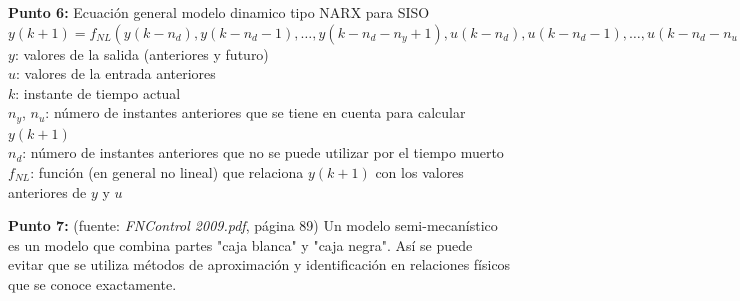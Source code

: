 \documentclass[10pt,onecolumn,twoside,letterpaper]{article}
\newcommand{\myreferences}{../../bib/library}
\begin{document}
\par{\bf \large Punto 6:} Ecuaci\'on general modelo dinamico tipo NARX para SISO\\
$y(k+1)=f_{NL}(y(k-n_d),y(k-n_d-1),\dots,y(k-n_d-n_y+1),u(k-n_d),u(k-n_d-1),\dots,u(k-n_d-n_u+1))$\\
$y$: valores de la salida (anteriores y futuro)\\
$u$: valores de la entrada anteriores\\
$k$: instante de tiempo actual\\
$n_y$, $n_u$: número de instantes anteriores que se tiene en cuenta para calcular $y(k+1)$\\
$n_d$: número de instantes anteriores que no se puede utilizar por el tiempo muerto\\
$f_{NL}$: función (en general no lineal) que relaciona $y(k+1)$ con los valores anteriores de $y$ y $u$\\

\par{\bf \large Punto 7:} (fuente: \textit{FNControl 2009.pdf}, página 89) Un modelo semi-mecanístico es un modelo que combina partes "caja blanca" y "caja negra". Así se puede evitar que se utiliza métodos de aproximación y identificación en relaciones físicos que se conoce exactamente.



\end{document}
